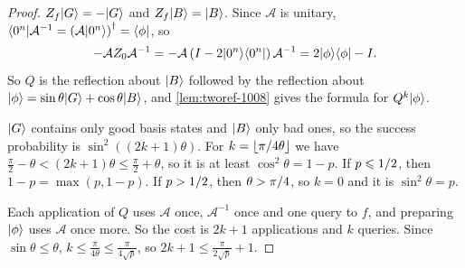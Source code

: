 \begin{exercisebox}
\begin{proof}
%
    $Z_f\lvert G \rangle = -\lvert G \rangle$ and $Z_f\lvert B \rangle = \lvert B \rangle$. Since $\mathcal{A}$ is unitary,
    $\langle 0^n \rvert\mathcal{A}^{-1} = \left(\mathcal{A}\lvert 0^n \rangle\right)^\dagger = \langle \phi \rvert$, so
    \[-\mathcal{A} Z_0 \mathcal{A}^{-1} = -\mathcal{A}\left(I - 2\lvert 0^n \rangle\langle 0^n \rvert\right)\mathcal{A}^{-1}
        = 2\lvert \phi \rangle\langle \phi \rvert - I.\]
    So $Q$ is the reflection about $\lvert B \rangle$ followed by the reflection about
    $\lvert \phi \rangle = \sin\theta\lvert G \rangle + \cos\theta\lvert B \rangle$, and \cref{lem:tworef-1008} gives the formula
    for $Q^k\lvert \phi \rangle$.

    $\lvert G \rangle$ contains only good basis states and $\lvert B \rangle$ only bad ones, so the success
    probability is $\sin^2((2k+1)\theta)$. For $k = \floor{\sfrac{\pi}{4\theta}}$ we have
    $\frac{\pi}{2} - \theta < (2k+1)\theta \leq \frac{\pi}{2} + \theta$, so it is at least
    $\cos^2\theta = 1 - p$. If $p \leqslant 1/2$, then $1 - p = \max(p, 1-p)$. If
    $p > 1/2$, then $\theta > \pi/4$, so $k = 0$ and it is $\sin^2\theta = p$.

    Each application of $Q$ uses $\mathcal{A}$ once, $\mathcal{A}^{-1}$ once and one query to $f$, and
    preparing $\lvert \phi \rangle$ uses $\mathcal{A}$ once more. So the cost is $2k + 1$ applications and
    $k$ queries. Since $\sin\theta \leq \theta$, $k \leq \frac{\pi}{4\theta} \leq \frac{\pi}{4\sqrt{p}}$,
    so $2k + 1 \leq \frac{\pi}{2\sqrt{p}} + 1$.
\end{proof}
\end{exercisebox}
